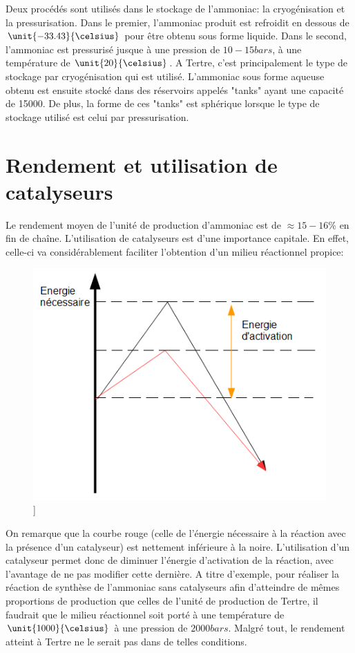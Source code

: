 Deux procédés sont utilisés dans le stockage de l'ammoniac: la cryogénisation et la pressurisation. Dans le premier, l'ammoniac produit est refroidit en dessous de $\unit{-33.43}{\celsius}$ pour être obtenu sous forme liquide. Dans le second, l'ammoniac est pressurisé jusque à une pression de $\unit{10-15}{bars}$, à une température de $\unit{20}{\celsius}$. A Tertre, c'est principalement le type de stockage par cryogénisation qui est utilisé. L'ammoniac sous forme aqueuse obtenu est ensuite stocké dans des réservoirs appelés "tanks" ayant une capacité de \unit{15000}{\tonne}. De plus, la forme de ces "tanks" est sphérique lorsque le type de stockage utilisé est celui par pressurisation.


\section*{Rendement et utilisation de catalyseurs}
Le rendement moyen de l'unité de production d'ammoniac est de $\approx 15-16\%$ en fin de chaîne. L'utilisation de catalyseurs est d'une importance capitale. En effet, celle-ci va considérablement faciliter l'obtention d'un milieu réactionnel propice:

\begin{figure} [h]
\begin{center}
\includegraphics[scale=0.5]{schrend}]
\end{center}
\end{figure}

On remarque que la courbe rouge (celle de l'énergie nécessaire à la réaction avec la présence d'un catalyseur) est nettement inférieure à la noire. L'utilisation d'un catalyseur permet donc de diminuer l'énergie d'activation de la réaction, avec l'avantage de ne pas modifier cette dernière. A titre d'exemple, pour réaliser la réaction de synthèse de l'ammoniac sans catalyseurs afin d'atteindre de mêmes proportions de production que celles de l'unité de production de Tertre, il faudrait que le milieu réactionnel soit porté à une température de $\unit{1000}{\celsius}$ à une pression de $\unit{2000}{bars}$. Malgré tout, le rendement atteint à Tertre ne le serait pas dans de telles conditions.

